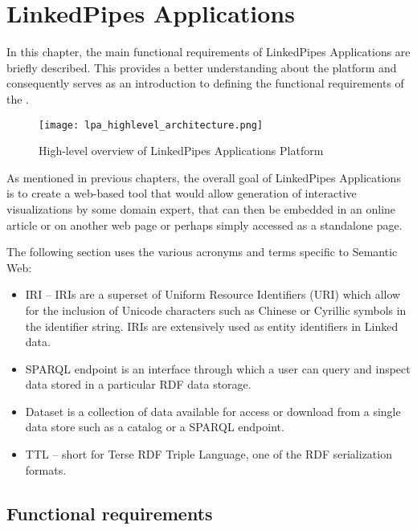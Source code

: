 \chapter{LinkedPipes Applications}
\label{chap:num_1}

In this chapter, the main functional requirements of LinkedPipes Applications are briefly described. This provides a better understanding about the platform and consequently serves as an introduction to defining the functional requirements of the \lpa{}.


\begin{figure}[h]

\centering
\texttt{[image: lpa\_highlevel\_architecture.png]}
\caption{High-level overview of LinkedPipes Applications Platform}
\label{fig:high-level-arch}
\end{figure}

As mentioned in previous chapters, the overall goal of LinkedPipes Applications is to create a web-based tool that would allow generation of interactive visualizations by some domain expert, that can then be embedded in an online article or on another web page or perhaps simply accessed as a standalone page.

The following section uses the various acronyms and terms specific to Semantic Web: 

\begin{itemize}
    \item \gls{IRI} -- IRIs are a superset of Uniform Resource Identifiers (URI) which allow for the inclusion of Unicode characters such as Chinese or Cyrillic symbols in the identifier string. IRIs are extensively used as entity identifiers in Linked data.
    \item SPARQL endpoint is an interface through which a user can query and inspect data stored in a particular RDF data storage.
    \item Dataset is a collection of data available for access or download from a single data store such as a catalog or a SPARQL endpoint.
    \item TTL -- short for Terse RDF Triple Language, one of the RDF serialization formats.
\end{itemize}

\section{Functional requirements}

